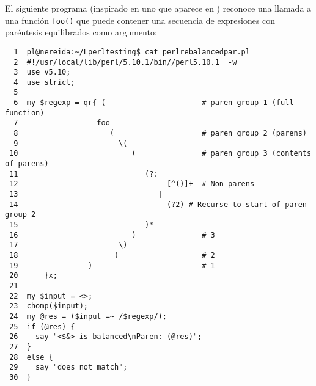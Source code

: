 
El siguiente programa (inspirado en uno
que aparece en )
reconoce una llamada a una función \verb|foo()|
que puede contener una secuencia de expresiones con paréntesis equilibrados
como argumento:

\begin{latexonly}
\begin{verbatim}
  1  pl@nereida:~/Lperltesting$ cat perlrebalancedpar.pl
  2  #!/usr/local/lib/perl/5.10.1/bin//perl5.10.1  -w
  3  use v5.10;
  4  use strict;
  5  
  6  my $regexp = qr{ (                      # paren group 1 (full function)
  7                  foo
  8                     (                    # paren group 2 (parens)
  9                       \(
 10                          (               # paren group 3 (contents of parens)
 11                             (?:
 12                                  [^()]+  # Non-parens
 13                                |
 14                                  (?2) # Recurse to start of paren group 2
 15                             )*
 16                          )               # 3
 17                       \)
 18                      )                   # 2
 19                )                         # 1
 20      }x;
 21  
 22  my $input = <>;
 23  chomp($input);
 24  my @res = ($input =~ /$regexp/);
 25  if (@res) {
 26    say "<$&> is balanced\nParen: (@res)";
 27  }
 28  else {
 29    say "does not match";
 30  }
\end{verbatim}
\end{latexonly}
